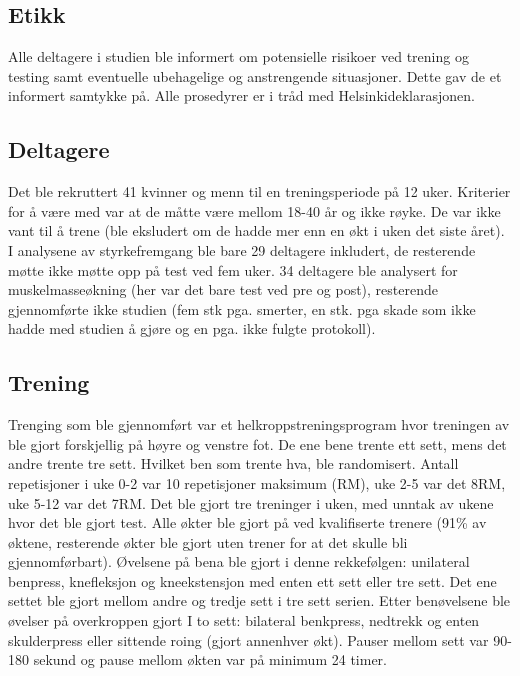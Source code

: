 \documentclass[
]{book}
\begin{document}
\hypertarget{etikk}{%
\subsection{Etikk}\label{etikk}}

Alle deltagere i studien ble informert om potensielle risikoer ved trening og testing samt eventuelle ubehagelige og anstrengende situasjoner. Dette gav de et informert samtykke på. Alle prosedyrer er i tråd med Helsinkideklarasjonen.

\hypertarget{deltagere}{%
\subsection{Deltagere}\label{deltagere}}

Det ble rekruttert 41 kvinner og menn til en treningsperiode på 12 uker. Kriterier for å være med var at de måtte være mellom 18-40 år og ikke røyke. De var ikke vant til å trene (ble eksludert om de hadde mer enn en økt i uken det siste året). I analysene av styrkefremgang ble bare 29 deltagere inkludert, de resterende møtte ikke møtte opp på test ved fem uker. 34 deltagere ble analysert for muskelmasseøkning (her var det bare test ved pre og post), resterende gjennomførte ikke studien (fem stk pga. smerter, en stk. pga skade som ikke hadde med studien å gjøre og en pga. ikke fulgte protokoll).

\hypertarget{trening}{%
\subsection{Trening}\label{trening}}

Trenging som ble gjennomført var et helkroppstreningsprogram hvor treningen av ble gjort forskjellig på høyre og venstre fot. De ene bene trente ett sett, mens det andre trente tre sett. Hvilket ben som trente hva, ble randomisert. Antall repetisjoner i uke 0-2 var 10 repetisjoner maksimum (RM), uke 2-5 var det 8RM, uke 5-12 var det 7RM. Det ble gjort tre treninger i uken, med unntak av ukene hvor det ble gjort test. Alle økter ble gjort på ved kvalifiserte trenere (91\% av øktene, resterende økter ble gjort uten trener for at det skulle bli gjennomførbart). Øvelsene på bena ble gjort i denne rekkefølgen: unilateral benpress, knefleksjon og kneekstensjon med enten ett sett eller tre sett. Det ene settet ble gjort mellom andre og tredje sett i tre sett serien. Etter benøvelsene ble øvelser på overkroppen gjort I to sett: bilateral benkpress, nedtrekk og enten skulderpress eller sittende roing (gjort annenhver økt). Pauser mellom sett var 90-180 sekund og pause mellom økten var på minimum 24 timer.
\end{document}
